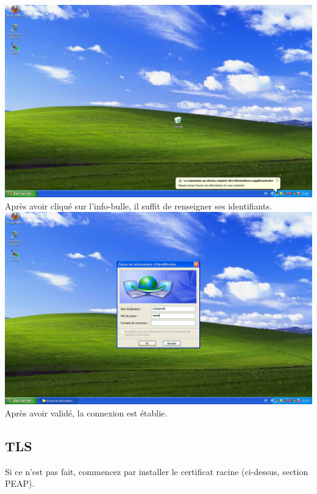 \includegraphics[width=\screenShotSize{}]{imgUser/md5Info.PNG}\\
Après avoir cliqué sur l'info-bulle, il suffit de renseigner ses identifiants.\\
\includegraphics[width=\screenShotSize{}]{imgUser/credentials.PNG}\\
Après avoir validé, la connexion est établie.



\subsection{TLS}

Si ce n'est pas fait, commencez par installer le certificat racine (ci-dessus, section PEAP).


